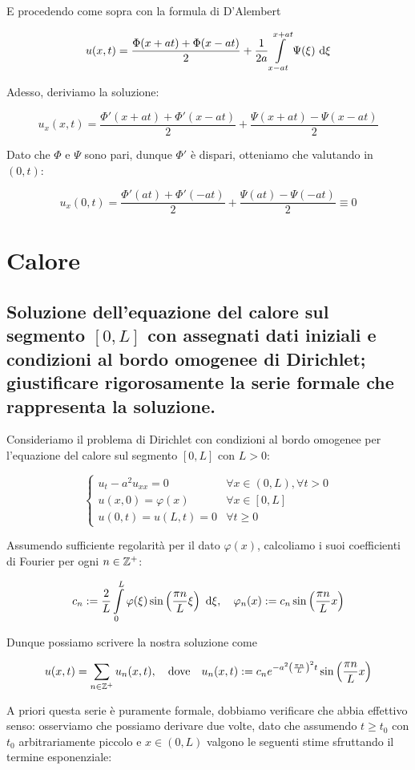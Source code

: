 \documentclass{article}
\begin{document}
E procedendo come sopra con la formula di D'Alembert

\[u(x,t) = \frac{\Phi(x+at) + \Phi(x-at) }{2} + \frac{1}{2a} \intop_{x-at}^{x+at} \Psi(\xi)\de \xi \]

Adesso, deriviamo la soluzione:

\[ u_x(x,t) = \frac{\Phi'(x+at) + \Phi'(x-at)}{2} + \frac{\Psi(x+at) - \Psi(x-at)}{2} \]

Dato che $\Phi$ e $\Psi$ sono pari, dunque $\Phi'$ è dispari, otteniamo che valutando in $(0,t)$:

\[ u_x(0,t) = \frac{\Phi'(at) + \Phi'(-at)}{2} + \frac{\Psi(at) - \Psi(-at)}{2} \equiv 0\]

\section{Calore}

\subsection{Soluzione dell'equazione del calore sul segmento $[0,L]$ con assegnati dati iniziali e condizioni al bordo omogenee di Dirichlet; giustificare rigorosamente la serie formale che rappresenta la
soluzione.}

Consideriamo il problema di Dirichlet con condizioni al bordo omogenee per l'equazione del calore sul segmento $[0,L]$ con $L>0$:

\[ \begin{cases} u_t - a^2 u_{xx} = 0 & \forall x \in (0,L), \forall t > 0 \\ u(x,0) = \varphi(x) & \forall x \in [0,L] \\ u(0,t) = u(L,t) = 0 & \forall t \ge 0 \end{cases}\]

Assumendo sufficiente regolarità per il dato $\varphi(x)$, calcoliamo i suoi coefficienti di Fourier per ogni $n \in \mathbb{Z}^+$:

\[ c_n := \frac{2}{L}\intop_0^L \varphi(\xi) \sin\left( \frac{\pi n}{L}\xi \right)\de\xi, \quad \varphi_n (x) := c_n \sin\left( \frac{\pi n}{L}x \right) \]

Dunque possiamo scrivere la nostra soluzione come 

\[ u(x,t) = \sum_{n\in \mathbb{Z}^{+}} u_n(x,t), \quad \text{dove}\quad u_n(x,t) := c_n e^{- a^2 \left( \frac{\pi n}{L}\right)^2 t }\sin \left( \frac{\pi n}{L}x \right)\]

A priori questa serie è puramente formale, dobbiamo verificare che abbia effettivo senso: osserviamo che possiamo derivare due volte, dato che assumendo $t \ge t_0$ con $t_0$ arbitrariamente piccolo e $x \in (0,L)$ valgono le seguenti stime sfruttando il termine esponenziale:
\end{document}
